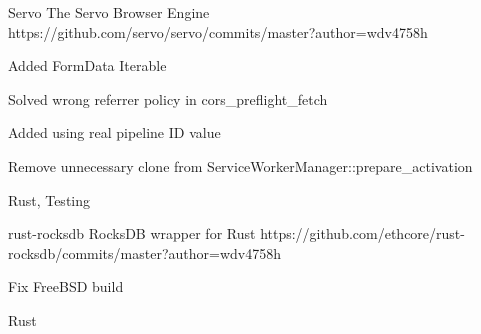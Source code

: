 
\begin{cvopensources}


  \cvopensource
    {Servo}
    {The Servo Browser Engine}
    {https://github.com/servo/servo/commits/master?author=wdv4758h}
    {
      \begin{cvitems}
        \item {Added FormData Iterable}
        \item {Solved wrong referrer policy in cors\_preflight\_fetch}
        \item {Added using real pipeline ID value}
        \item {Remove unnecessary clone from ServiceWorkerManager::prepare\_activation}
      \end{cvitems}
    }
    {Rust, Testing}

  \cvopensource
    {rust-rocksdb}
    {RocksDB wrapper for Rust}
    {https://github.com/ethcore/rust-rocksdb/commits/master?author=wdv4758h}
    {
      \begin{cvitems}
        \item {Fix FreeBSD build}
      \end{cvitems}
    }
    {Rust}


\end{cvopensources}
